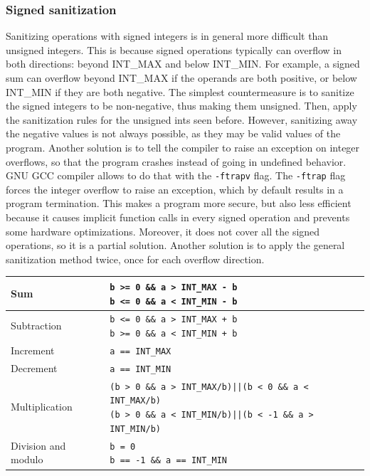 \documentclass[a4paper,12pt]{article}
\begin{document}
\subsubsection{Signed sanitization}
Sanitizing operations with signed integers is in general more difficult than unsigned integers. This is because signed operations typically can overflow in both directions: beyond INT\_MAX and below INT\_MIN. For example, a signed sum can overflow beyond INT\_MAX if the operands are both positive, or below INT\_MIN if they are both negative.
The simplest countermeasure is to sanitize the signed integers to be non-negative, thus making them unsigned. Then, apply the sanitization rules for the unsigned ints seen before. However, sanitizing away the negative values is not always possible, as they may be valid values of the program. Another solution is to tell the compiler to raise an exception on integer overflows, so that the program crashes instead of going in undefined behavior. GNU GCC compiler allows to do that with the \texttt{-ftrapv} flag. The \texttt{-ftrap} flag forces the integer overflow to raise an exception, which by default results in a program termination. This makes a program more secure, but also less efficient because it causes implicit function calls in every signed operation and prevents some hardware optimizations. Moreover, it does not cover all the signed operations, so it is a partial solution. Another solution is to apply the general sanitization method twice, once for each overflow direction.

\begin{center}
\begin{tabular}{|l|l|}
\hline
Sum & \makecell[l]{\texttt{b >= 0 \&\& a > INT\_MAX - b} \\ \texttt{b <= 0 \&\& a < INT\_MIN - b}} \\
\hline
Subtraction & \makecell[l]{\texttt{b <= 0 \&\& a > INT\_MAX + b} \\ \texttt{b >= 0 \&\& a < INT\_MIN + b}} \\
\hline
Increment & \texttt{a == INT\_MAX} \\
\hline
Decrement & \texttt{a == INT\_MIN} \\
\hline
Multiplication & \makecell[l]{\texttt{(b > 0 \&\& a > INT\_MAX/b)||(b < 0 \&\& a < INT\_MAX/b)} \\ \texttt{(b > 0 \&\& a < INT\_MIN/b)||(b < -1 \&\& a > INT\_MIN/b)}} \\
\hline
Division and modulo & \makecell[l]{\texttt{b = 0} \\ \texttt{b == -1 \&\& a == INT\_MIN}} \\
\hline
\end{tabular}
\end{center}
\end{document}
